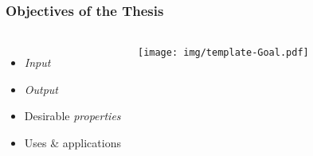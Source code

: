 
\begin{frame}
  \frametitle{Objectives of the Thesis}
  \begin{columns}
    \begin{itemize}
        \item \emph{Input}
        \item \emph{Output}
        \item Desirable \emph{properties}
        \item Uses \& applications
    \end{itemize}

        \texttt{[image: img/template-Goal.pdf]}
  \end{columns}
\end{frame}





